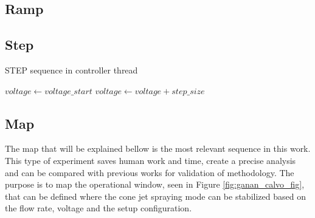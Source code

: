 \subsection{Ramp}



\subsection{Step}
\label{subsec:step_routine}


\begin{algorithm}
    \caption{STEP sequence in controller thread}\label{alg:stepping_algorithm}
    \begin{algorithmic}
        \State $voltage \gets voltage\_start$
         
            \State {}
            \State {}
            \State $voltage \gets voltage + step\_size$
        \EndWhile
    \EndProcedure

    \end{algorithmic}
\end{algorithm}

\subsection{Map}

The map that will be explained bellow is the most relevant sequence in this work. This type of experiment saves human work and time, create a precise analysis and can be compared with previous works for validation of methodology.
The purpose is to map the operational window, seen in Figure \ref{fig:ganan_calvo_fig}, that can be defined where the cone jet spraying mode can be stabilized based on the flow rate, voltage and the setup configuration\cite{gananCalvo}.

